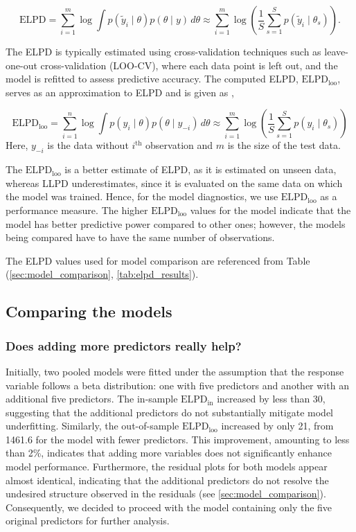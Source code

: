 \documentclass[12pt]{article}
\begin{document}
\[
\text{ELPD} = \sum_{i=1}^{m} \log \int p(\tilde{y}_i \mid \theta) p(\theta \mid y) \, d\theta \approx \sum_{i=1}^{m} \log \left( \frac{1}{S} \sum_{s=1}^{S} p(\tilde{y}_i \mid \theta_s) \right).
\]  

The ELPD is typically estimated using cross-validation techniques such as leave-one-out cross-validation (LOO-CV), where each data point is left out, and the model is refitted to assess predictive accuracy. The computed ELPD, $\text{ELPD}_{\text{loo}}$, serves as an approximation to ELPD and is given as \parencite{gelman2013bayesian}, 

\[
\text{ELPD}_{\text{loo}} = \sum_{i=1}^{n} \log \int p( y_{i} \mid \theta) p(\theta \mid y_{-i}) \, d\theta \approx \sum_{i=1}^{m} \log \left( \frac{1}{S} \sum_{s=1}^{S} p(y_i \mid \theta_s) \right)
\]  
Here, $y_{-i}$ is the data without $i^{\text{th}}$ observation and $m$ is the size of the test data.

The $\text{ELPD}_{\text{loo}}$ is a better estimate of ELPD, as it is estimated on unseen data, whereas LLPD underestimates, since it is evaluated on the same data on which the model was trained. Hence, for the model diagnostics, we use $\text{ELPD}_{\text{loo}}$ as a performance measure. The higher $\text{ELPD}_{\text{loo}}$ values for the model indicate that the model has better predictive power compared to other ones; however, the models being compared have to have the same number of observations. 

The ELPD values used for model comparison are referenced from Table (\autoref{sec:model_comparison}, \autoref{tab:elpd_results}).

\subsection{Comparing the models}\label{(..)}
\subsubsection{Does adding more predictors really help?}
Initially, two pooled models were fitted under the assumption that the response variable follows a beta distribution: one with five predictors and another with an additional five predictors. The in-sample $\text{ELPD}_{\text{in}}$ increased by less than 30, suggesting that the additional predictors do not substantially mitigate model underfitting. Similarly, the out-of-sample $\text{ELPD}_{\text{loo}}$ increased by only 21, from 1461.6 for the model with fewer predictors. This improvement, amounting to less than 2\%, indicates that adding more variables does not significantly enhance model performance. Furthermore, the residual plots for both models appear almost identical, indicating that the additional predictors do not resolve the undesired structure observed in the residuals (see \autoref{sec:model_comparison}). Consequently, we decided to proceed with the model containing only the five original predictors for further analysis.
\end{document}
